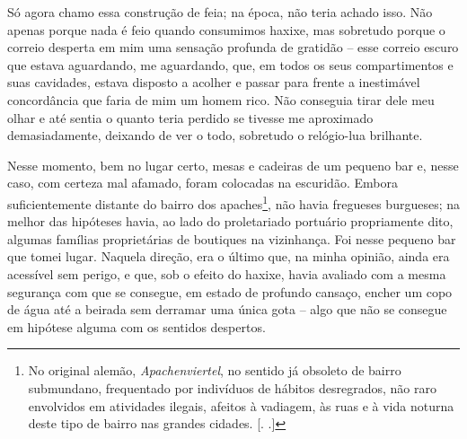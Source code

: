 Só agora chamo essa construção de feia; na época, não teria achado isso.
Não apenas porque nada é feio quando consumimos haxixe, mas sobretudo
porque o correio desperta em mim uma sensação profunda de gratidão --
esse correio escuro que estava aguardando, me aguardando, que, em todos
os seus compartimentos e suas cavidades, estava disposto a acolher e
passar para frente a inestimável concordância que faria de mim um homem
rico. Não conseguia tirar dele meu olhar e até sentia o quanto teria
perdido se tivesse me aproximado demasiadamente, deixando de ver o todo,
sobretudo o relógio-lua brilhante.

Nesse momento, bem no lugar certo, mesas e cadeiras de um pequeno bar e,
nesse caso, com certeza mal afamado, foram colocadas na escuridão.
Embora suficientemente distante do bairro dos apaches\footnote{No
  original alemão, \emph{Apachenviertel}, no sentido já obsoleto de
  bairro submundano, frequentado por indivíduos de hábitos desregrados,
  não raro envolvidos em atividades ilegais, afeitos à vadiagem, às ruas
  e à vida noturna deste tipo de bairro nas grandes cidades. [. .]}, não havia
fregueses burgueses; na melhor das hipóteses havia, ao lado do
proletariado portuário propriamente dito, algumas famílias proprietárias
de boutiques na vizinhança. Foi nesse pequeno bar que tomei lugar.
Naquela direção, era o último que, na minha opinião, ainda era acessível
sem perigo, e que, sob o efeito do haxixe, havia avaliado com a mesma
segurança com que se consegue, em estado de profundo cansaço, encher um
copo de água até a beirada sem derramar uma única gota -- algo que não
se consegue em hipótese alguma com os sentidos despertos.

